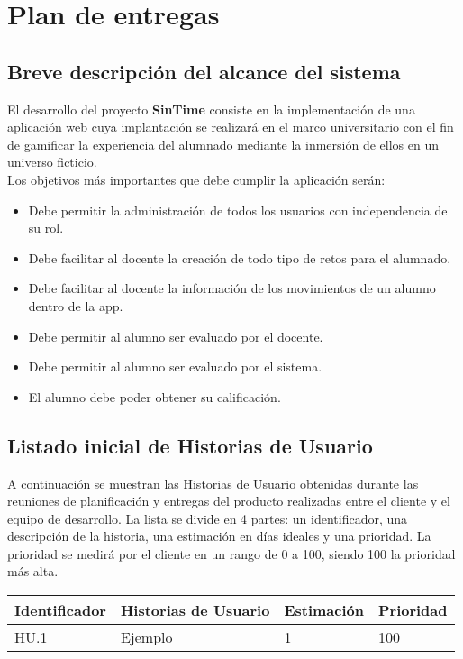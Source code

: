 \setcounter{chapter}{4}
\setcounter{section}{0}
\setcounter{subsection}{0}
\chapter{Plan de entregas}

\section{Breve descripción del alcance del sistema}
El desarrollo del proyecto \textbf{SinTime} consiste en la implementación de una aplicación web cuya implantación se realizará en el marco universitario con el fin de gamificar la experiencia del alumnado mediante la inmersión de ellos en un universo ficticio.\\

Los objetivos más importantes que debe cumplir la aplicación serán:

\begin{itemize}
	\item Debe permitir la administración de todos los usuarios con independencia de su rol.
	\item Debe facilitar al docente la creación de todo tipo de retos para el alumnado.
	\item Debe facilitar al docente la información de los movimientos de un alumno dentro de la app.
	\item Debe permitir al alumno ser evaluado por el docente.
	\item Debe permitir al alumno ser evaluado por el sistema.
	\item El alumno debe poder obtener su calificación.
\end{itemize}

\section{Listado inicial de Historias de Usuario}

A continuación se muestran las Historias de Usuario obtenidas durante las reuniones de planificación y entregas del producto realizadas entre el cliente y el equipo de desarrollo. La lista se divide en 4 partes: un identificador, una descripción de la historia, una estimación en días ideales y una prioridad. La prioridad se medirá por el cliente en un rango de 0 a 100, siendo 100 la prioridad más alta.\\

\begin{table}[h]
	\centering
	\begin{tabular}{| p{2.3cm} | p{5.1cm} | p{2cm} | p{1.6cm} |}
		\rowcolor[HTML]{329A9D} 
		{\color[HTML]{FFFFFF} \textbf{Identificador}} & {\color[HTML]{FFFFFF} \textbf{Historias de Usuario}} & {\color[HTML]{FFFFFF} \textbf{Estimación}} & {\color[HTML]{FFFFFF} \textbf{Prioridad}} \\ \hline
		HU.1 & Ejemplo & 1 & 100 \\         
		\hline              
	\end{tabular}
\end{table}

